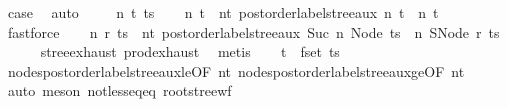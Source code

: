 \begin{isabellebody}
\ {\isacharquery}{\kern0pt}case\ \isamarkupfalse%
\ auto\isanewline
{}\isamarkupfalse%
\isanewline
\ \ \isamarkupfalse%
\ {\isacharparenleft}{\kern0pt}{}\ n\ t\ ts{\isacharparenright}{\kern0pt}\isanewline
\ \ \isamarkupfalse%
\ n{\isacharprime}{\kern0pt}\ t{\isacharprime}{\kern0pt}\ \ nt{\isacharprime}{\kern0pt}{\isacharcolon}{\kern0pt}\ {\isachardoublequoteopen}postorder{\isacharunderscore}{\kern0pt}label{\isacharunderscore}{\kern0pt}stree{\isacharunderscore}{\kern0pt}aux\ n\ t\ {\isacharequal}{\kern0pt}\ {\isacharparenleft}{\kern0pt}n{\isacharprime}{\kern0pt}{\isacharcomma}{\kern0pt}\ t{\isacharprime}{\kern0pt}{\isacharparenright}{\kern0pt}{\isachardoublequoteclose}\ \isamarkupfalse%
\ fastforce\isanewline
\ \ \isamarkupfalse%
\ n{\isacharprime}{\kern0pt}{\isacharprime}{\kern0pt}\ r\ ts{\isacharprime}{\kern0pt}\ \ nt{\isacharprime}{\kern0pt}{\isacharprime}{\kern0pt}{\isacharcolon}{\kern0pt}\ {\isachardoublequoteopen}postorder{\isacharunderscore}{\kern0pt}label{\isacharunderscore}{\kern0pt}stree{\isacharunderscore}{\kern0pt}aux\ {\isacharparenleft}{\kern0pt}Suc\ n{\isacharprime}{\kern0pt}{\isacharparenright}{\kern0pt}\ {\isacharparenleft}{\kern0pt}Node\ ts{\isacharparenright}{\kern0pt}\ {\isacharequal}{\kern0pt}\ {\isacharparenleft}{\kern0pt}n{\isacharprime}{\kern0pt}{\isacharprime}{\kern0pt}{\isacharcomma}{\kern0pt}\ SNode\ r\ ts{\isacharprime}{\kern0pt}{\isacharparenright}{\kern0pt}{\isachardoublequoteclose}\isanewline
\ \ \ \ \isamarkupfalse%
\ stree{\isachardot}{\kern0pt}exhaust\ prod{\isachardot}{\kern0pt}exhaust\ \isamarkupfalse%
\ metis\isanewline
\ \ \isamarkupfalse%
\ {\isachardoublequoteopen}t{\isacharprime}{\kern0pt}\ {\isasymnotin}\ fset\ ts{\isacharprime}{\kern0pt}{\isachardoublequoteclose}\ \isamarkupfalse%
\ nodes{\isacharunderscore}{\kern0pt}postorder{\isacharunderscore}{\kern0pt}label{\isacharunderscore}{\kern0pt}stree{\isacharunderscore}{\kern0pt}aux{\isacharunderscore}{\kern0pt}le{\isacharbrackleft}{\kern0pt}OF\ nt{\isacharprime}{\kern0pt}{\isacharbrackright}{\kern0pt}\ nodes{\isacharunderscore}{\kern0pt}postorder{\isacharunderscore}{\kern0pt}label{\isacharunderscore}{\kern0pt}stree{\isacharunderscore}{\kern0pt}aux{\isacharunderscore}{\kern0pt}ge{\isacharbrackleft}{\kern0pt}OF\ nt{\isacharprime}{\kern0pt}{\isacharprime}{\kern0pt}{\isacharbrackright}{\kern0pt}\isanewline
\ \ \ \ \isamarkupfalse%
\ {\isacharparenleft}{\kern0pt}auto{\isacharcomma}{\kern0pt}\ meson\ not{\isacharunderscore}{\kern0pt}less{\isacharunderscore}{\kern0pt}eq{\isacharunderscore}{\kern0pt}eq\ root{\isacharunderscore}{\kern0pt}stree{\isacharunderscore}{\kern0pt}wf{\isacharparenright}{\kern0pt}\isanewline

\end{isabellebody}
